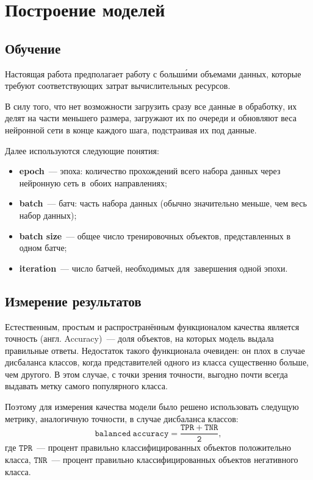 \section{Построение моделей}
\subsection{Обучение}

Настоящая работа предполагает работу с больш\'{и}ми объемами данных, 
которые требуют соответствующих затрат вычислительных ресурсов. 

В силу того, что нет возможности загрузить сразу все данные в обработку,
их делят на части меньшего размера, 
загружают их по очереди и обновляют веса нейронной сети в конце каждого шага, 
подстраивая их под данные.

\clearpage
Далее используются следующие понятия:
\begin{itemize}[wide]
	\item \textbf{epoch}~--- эпоха: количество прохождений всего набора данных через нейронную 
	сеть в~обоих направлениях;
	
	\item \textbf{batch}~--- батч: часть набора данных (обычно значительно меньше, чем весь набор данных);
	
	\item \textbf{batch size}~--- общее число тренировочных объектов, 
	представленных в одном батче;
	
	\item \textbf{iteration}~--- число батчей, необходимых для~завершения одной эпохи.
\end{itemize}

\subsection{Измерение результатов}
Естественным, простым и распространённым функционалом качества является точность (англ. Accuracy)~---
доля объектов, на которых модель выдала правильные ответы. Недостаток такого функционала 
очевиден: он плох в случае дисбаланса классов, когда представителей одного из класса существенно 
больше, чем другого. В этом случае, с точки зрения точности, выгодно почти всегда выдавать 
метку самого популярного класса. 

Поэтому для измерения качества модели было решено использовать следущую метрику, аналогичную 
точности, в случае дисбаланса классов: 
\[
\mathtt{balanced\ accuracy = \frac{TPR+TNR}{2}},
\]
где $ \mathtt{TPR} $~--- процент правильно классифицированных объектов положительно класса,
$ \mathtt{TNR} $~--- процент правильно классифицированных объектов негативного класса.

